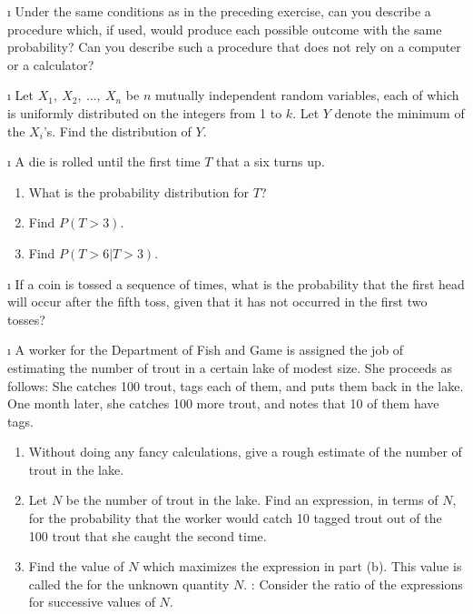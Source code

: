 \begin{LJSItem}
\i\label{exer 5.1.104} Under the same conditions as in the preceding exercise, can
you describe a procedure which, if used, would produce each possible outcome with the
same probability?  Can you describe such a procedure that does not rely on a computer
or a calculator?

\i\label{exer 5.1.105} Let $X_1,\ X_2,\ \ldots,\ X_n$ be $n$ mutually independent
random variables, each of which is uniformly distributed on the integers from 1 to
$k$.  Let $Y$ denote the minimum of the $X_i$'s.  Find the distribution of $Y$.

\i\label{exer 5.1.16} A die is rolled until the first time $T$ that a six turns up.
\begin{enumerate}

\item What is the probability distribution for $T$?

\item Find $P(T > 3)$.

\item Find $P(T > 6 | T > 3)$.
\end{enumerate}

\i\label{5.1.18} If a coin is tossed a sequence of times, what is the probability
that the first head will occur after the fifth toss, given that it has not occurred in
the first two tosses?

\i\label{exer 5.1.106} A worker for the Department of Fish and Game is assigned
the job of estimating the number of trout in a certain lake of modest size.  She
proceeds as follows:  She catches 100 trout, tags each of them, and puts them back in
the lake.  One month later, she catches 100 more trout, and notes that 10 of them
have tags.  
\begin{enumerate}
\item Without doing any fancy calculations, give a rough estimate of the number of
trout in the lake.
\item Let $N$ be the number of trout in the lake.  Find an expression, in terms of
$N$, for the probability that the worker would catch 10 tagged trout out of the 100
trout that she caught the second time.
\item Find the value of $N$ which maximizes the expression in part (b).  This value is
called the  for the 
unknown quantity
$N$.    :  Consider the ratio of the expressions for successive values of $N$.
\end{enumerate}


\end{LJSItem}
